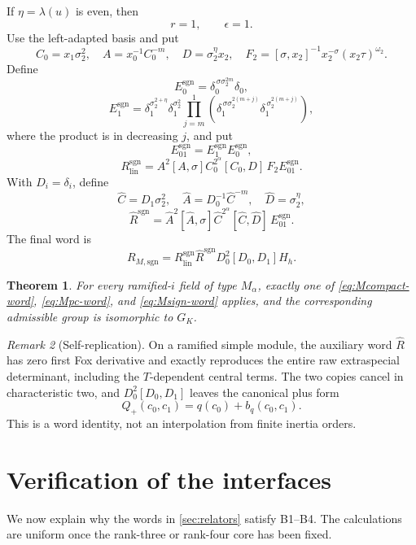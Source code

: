 \documentclass[11pt,reqno]{amsart}
\newtheorem{theorem}{Theorem}[section]
\theoremstyle{definition}
\theoremstyle{remark}
\newtheorem{remark}[theorem]{Remark}
\numberwithin{equation}{section}
\newcommand{\sgn}{\mathrm{sgn}}
\begin{document}
If \(\eta=\lambda(u)\) is even, then
\[
 r=1,\qquad\epsilon=1.
\]
Use the left-adapted basis and put
\[
 C_0=x_1\sigma_2^2,\quad
 A=x_0^{-1}C_0^{-m},\quad
 D=\sigma_2^\eta x_2,\quad
 F_2=[\sigma,x_2]^{-1}x_2^{-\sigma}
       (x_2\tau)^{\omega_2}.
\]
Define
\[
 E_0^{\sgn}=\delta_0^{\,\sigma\sigma_2^{2m}}\delta_0,
\]
\begin{equation}\label{eq:E1sign}
 E_1^{\sgn}
 =
 \delta_1^{\sigma_2^{2+\eta}}
 \delta_1^{\sigma_2^2}
 \prod_{j=m}^{1}
 \left(
 \delta_1^{\,\sigma\sigma_2^{2(m+j)}}
 \delta_1^{\,\sigma_2^{2(m+j)}}
 \right),
\end{equation}
where the product is in decreasing \(j\), and put
\[
 E_{01}^{\sgn}=E_1^{\sgn}E_0^{\sgn},
\]
\[
 R_{\mathrm{lin}}^{\sgn}
 =A^2[A,\sigma]C_0^{2^\alpha}[C_0,D]\,
 F_2E_{01}^{\sgn}.
\]
With \(D_i=\delta_i\), define
\[
 \widehat C=D_1\sigma_2^2,\quad
 \widehat A=D_0^{-1}\widehat C^{-m},\quad
 \widehat D=\sigma_2^\eta,
\]
\[
 \widehat R^{\sgn}
 =\widehat A^2[\widehat A,\sigma]
 \widehat C^{2^\alpha}[\widehat C,\widehat D]\,
 E_{01}^{\sgn}.
\]
The final word is
\begin{equation}\label{eq:Msign-word}
 R_{M,\sgn}
 =R_{\mathrm{lin}}^{\sgn}\widehat R^{\sgn}
 D_0^2[D_0,D_1]H_h.
\end{equation}

\begin{theorem}\label{thm:Mwords}
For every ramified-\(i\) field of type \(M_\alpha\), exactly one of
\eqref{eq:Mcompact-word}, \eqref{eq:Mpc-word}, and
\eqref{eq:Msign-word} applies, and the corresponding admissible group is
isomorphic to \(G_K\).
\end{theorem}

\begin{remark}[Self-replication]
On a ramified simple module, the auxiliary word \(\widehat R\) has zero
first Fox derivative and exactly reproduces the entire raw extraspecial
determinant, including the \(T\)-dependent central terms.  The two copies
cancel in characteristic two, and \(D_0^2[D_0,D_1]\) leaves the canonical
plus form
\[
 Q_+(c_0,c_1)=q(c_0)+b_q(c_0,c_1).
\]
This is a word identity, not an interpolation from finite inertia
orders.
\end{remark}

\section{Verification of the interfaces}\label{sec:verification}

We now explain why the words in \cref{sec:relators} satisfy B1--B4.
The calculations are uniform once the rank-three or rank-four core has
been fixed.
\end{document}

